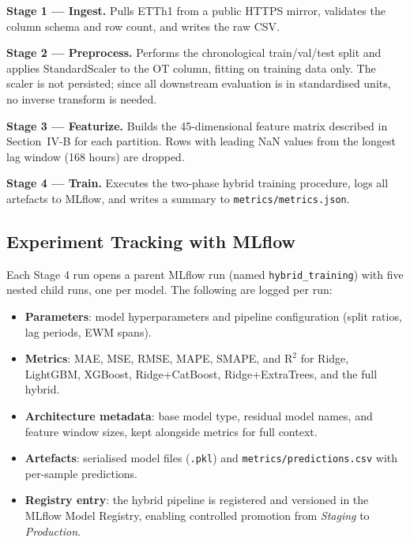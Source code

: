 \documentclass[conference]{IEEEtran}
\begin{document}
  \textbf{Stage 1 --- Ingest.} Pulls ETTh1 from a public HTTPS mirror, validates the
  column schema and row count, and writes the raw CSV.

  \textbf{Stage 2 --- Preprocess.} Performs the chronological train/val/test split
  and applies StandardScaler to the OT column, fitting on training data only. The
  scaler is not persisted; since all downstream evaluation is in standardised units,
  no inverse transform is needed.

  \textbf{Stage 3 --- Featurize.} Builds the 45-dimensional feature matrix described
  in Section~IV-B for each partition. Rows with leading NaN values from the longest
  lag window (168 hours) are dropped.

  \textbf{Stage 4 --- Train.} Executes the two-phase hybrid training procedure,
  logs all artefacts to MLflow, and writes a summary to
  \texttt{metrics/metrics.json}.

  \subsection{Experiment Tracking with MLflow}

  Each Stage 4 run opens a parent MLflow run (named \texttt{hybrid\_training}) with
  five nested child runs, one per model. The following are logged per run:
  \begin{itemize}
    \item \textbf{Parameters}: model hyperparameters and pipeline configuration
      (split ratios, lag periods, EWM spans).

    \item \textbf{Metrics}: MAE, MSE, RMSE, MAPE, SMAPE, and $\text{R}^{2}$ for
      Ridge, LightGBM, XGBoost, Ridge+CatBoost, Ridge+ExtraTrees, and the full
      hybrid.

    \item \textbf{Architecture metadata}: base model type, residual model names,
      and feature window sizes, kept alongside metrics for full context.

    \item \textbf{Artefacts}: serialised model files (\texttt{.pkl}) and
      \texttt{metrics/predictions.csv} with per-sample predictions.

    \item \textbf{Registry entry}: the hybrid pipeline is registered and versioned
      in the MLflow Model Registry, enabling controlled promotion from
      \emph{Staging} to \emph{Production}.
  \end{itemize}
\end{document}
